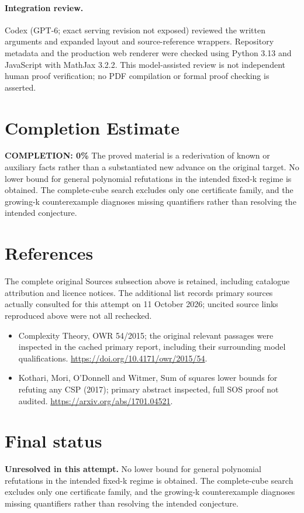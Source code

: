 \documentclass[11pt]{article}
\begin{document}
\paragraph{Integration review.} Codex (GPT-6; exact serving revision not exposed) reviewed the written arguments and expanded layout and source-reference wrappers. Repository metadata and the production web renderer were checked using Python 3.13 and JavaScript with MathJax 3.2.2. This model-assisted review is not independent human proof verification; no PDF compilation or formal proof checking is asserted.

\section{Completion Estimate}
\noindent\textbf{COMPLETION: 0\%}
The proved material is a rederivation of known or auxiliary facts rather than a substantiated new advance on the original target. No lower bound for general polynomial refutations in the intended fixed-k regime is obtained. The complete-cube search excludes only one certificate family, and the growing-k counterexample diagnoses missing quantifiers rather than resolving the intended conjecture.
\section{References}
The complete original Sources subsection above is retained, including catalogue attribution and licence notices. The additional list records primary sources actually consulted for this attempt on 11 October 2026; uncited source links reproduced above were not all rechecked.
\begin{itemize}
\item Complexity Theory, OWR 54/2015; the original relevant passages were inspected in the cached primary report, including their surrounding model qualifications. \url{https://doi.org/10.4171/owr/2015/54}.
\item Kothari, Mori, O’Donnell and Witmer, Sum of squares lower bounds for refuting any CSP (2017); primary abstract inspected, full SOS proof not audited. \url{https://arxiv.org/abs/1701.04521}.
\end{itemize}
\section{Final status}
\textbf{Unresolved in this attempt.} No lower bound for general polynomial refutations in the intended fixed-k regime is obtained. The complete-cube search excludes only one certificate family, and the growing-k counterexample diagnoses missing quantifiers rather than resolving the intended conjecture.
\end{document}
